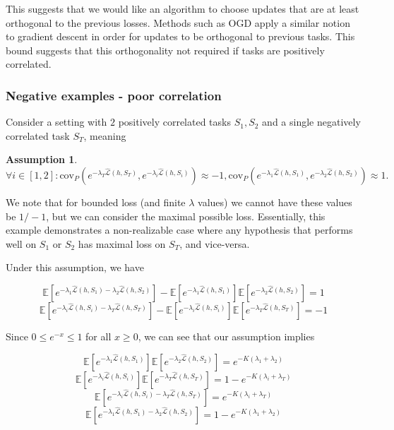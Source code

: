 \documentclass[letterpaper]{article}
\theoremstyle{definition}
\newtheorem{assumption}{Assumption}
\begin{document}
This suggests that we would like an algorithm to choose updates that are at least orthogonal to the previous losses. Methods such as OGD \citep{farajtabar2020orthogonal} apply a similar notion to gradient descent in order for updates to be orthogonal to previous tasks. This bound suggests that this orthogonality not required if tasks are positively correlated.
\fi

\subsubsection{Negative examples - poor correlation}

Consider a setting with $2$ positively correlated tasks $S_1,S_2$ and a single negatively correlated task $S_T$, meaning

\begin{assumption}
$$\forall i\in [1,2]: \mathrm{cov}_{P}(e^{-\lambda_T\hat{\mathcal{L}}(h,S_T)}, e^{-\lambda_i\hat{\mathcal{L}}(h,S_i)})\approx -1, \mathrm{cov}_{P}(e^{-\lambda_1\hat{\mathcal{L}}(h,S_1)}, e^{-\lambda_2\hat{\mathcal{L}}(h,S_2)})\approx 1.$$
\end{assumption}

We note that for bounded loss (and finite $\lambda$ values) we cannot have these values be $1/-1$, but we can consider the maximal possible loss. Essentially, this example demonstrates a non-realizable case where any hypothesis that performs well on $S_1$ or $S_2$ has maximal loss on $S_T$, and vice-versa.

Under this assumption, we have

$$\mathbb{E}\left [e^{-\lambda_1\hat{\mathcal{L}}(h,S_1)-\lambda_2\hat{\mathcal{L}}(h,S_2)} \right]-\mathbb{E}\left [e^{-\lambda_1\hat{\mathcal{L}}(h,S_1)} \right]\mathbb{E}\left [e^{-\lambda_2\hat{\mathcal{L}}(h,S_2)} \right]=1$$
$$\mathbb{E}\left [e^{-\lambda_i\hat{\mathcal{L}}(h,S_i)-\lambda_T\hat{\mathcal{L}}(h,S_T)} \right]-\mathbb{E}\left [e^{-\lambda_i\hat{\mathcal{L}}(h,S_i)} \right]\mathbb{E}\left [e^{-\lambda_T\hat{\mathcal{L}}(h,S_T)} \right]=-1$$

Since $0\leq e^{-x}\leq 1$ for all $x\geq 0$, we can see that our assumption implies

$$\mathbb{E}\left [e^{-\lambda_1\hat{\mathcal{L}}(h,S_1)} \right]\mathbb{E}\left [e^{-\lambda_2\hat{\mathcal{L}}(h,S_2)} \right]=e^{-K(\lambda_1+\lambda_2)}$$
$$\mathbb{E}\left [e^{-\lambda_i\hat{\mathcal{L}}(h,S_i)} \right]\mathbb{E}\left [e^{-\lambda_T\hat{\mathcal{L}}(h,S_T)} \right]=1-e^{-K(\lambda_i+\lambda_T)}$$
$$\mathbb{E}\left [e^{-\lambda_i\hat{\mathcal{L}}(h,S_i)-\lambda_T\hat{\mathcal{L}}(h,S_T)} \right]=e^{-K(\lambda_i+\lambda_T)}$$
$$\mathbb{E}\left [e^{-\lambda_1\hat{\mathcal{L}}(h,S_1)-\lambda_2\hat{\mathcal{L}}(h,S_2)} \right]=1-e^{-K(\lambda_1+\lambda_2)}$$
\end{document}
